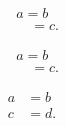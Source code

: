 \begin{align*} & a = b \\ &\quad = c.
\end{align*}

\begin{equation*} \begin{split} & a = b \\ &\quad = c.
	\end{split}
\end{equation*}

\begin{align*}  a & = b \\ c & = d.
\end{align*}
